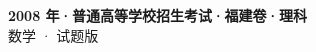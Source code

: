 \documentclass[zihao=-4, a4paper]{ctexart}
\begin{document}
\begin{center}
  {\Large\bfseries 2008 年·普通高等学校招生考试·福建卷·理科}\\[4pt]
  {\large 数学 · 试题版}
\end{center}
\medskip
{}

\end{document}
